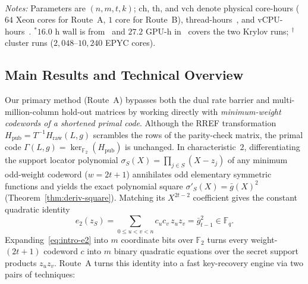 \documentclass[11pt,a4paper]{article}
\theoremstyle{definition}
\theoremstyle{remark}
\newcommand{\F}{\mathbb{F}}
\begin{document}
\begin{table}[t]
{{\begin{tabular}{@{}llcccccl@{}}
\bottomrule
\end{tabular}}
\\[0.35em]
\parbox{\textwidth}{\footnotesize
\emph{Notes:} Parameters are $(n, m, t, k)$; $\text{ch}$, $\text{th}$, and $\text{vch}$ denote physical core-hours ($64$ Xeon cores for Route~A, $1$ core for Route~B), thread-hours~\cite{Wei26}, and vCPU-hours~\cite{Saa26a}. $^\ast$$16.0\text{ h}$ wall is from~\cite{SaaRepo} and $27.2\text{ GPU-h}$ in~\cite{Saa26b} covers the two Krylov runs; $^\dagger$cluster runs ($2{,}048\text{--}10{,}240$ EPYC cores).}}
\end{table}

\subsection{Main Results and Technical Overview}
Our primary method (Route~A) bypasses both the dual rate barrier and multi-million-column hold-out matrices by working directly with \emph{minimum-weight codewords of a shortened primal code}. Although the RREF transformation $H_{\text{pub}} = T^{-1} H_{\text{raw}}(L, g)$ scrambles the rows of the parity-check matrix, the primal code $\Gamma(L, g) = \ker_{\F_2}(H_{\text{pub}})$ is unchanged. In characteristic~$2$, differentiating the support locator polynomial $\sigma_S(X) = \prod_{j \in S}(X - z_j)$ of any minimum odd-weight codeword ($w = 2t + 1$) annihilates odd elementary symmetric functions and yields the exact polynomial square $\sigma'_S(X) = \bar{g}(X)^2$~\cite{Pat75,MS77,Fin03} (Theorem~\ref{thm:deriv-square}). Matching its $X^{2t-2}$ coefficient gives the constant quadratic identity
\begin{equation}
\label{eq:intro-e2}
    e_2(z_S) = \sum_{0 \le u < v < n} c_u c_v\, z_u z_v = \bar{g}_{t-1}^2 \in \F_q.
\end{equation}
Expanding~\eqref{eq:intro-e2} into $m$ coordinate bits over $\F_2$ turns every weight-$(2t+1)$ codeword $c$ into $m$ binary quadratic equations over the secret support products $z_u z_v$. Route~A turns this identity into a fast key-recovery engine via two pairs of techniques:
\end{document}
